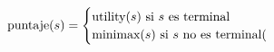 \documentclass[preview]{standalone}
\begin{document}
\begin{align*}
\text{puntaje($s$)} =  \begin{cases}\text{utility($s$) si $s$ es terminal} \cr
                                 \text{minimax($s$) si $s$ no es terminal}( \cr
                                 \end{cases}
\end{align*}
\end{document}
